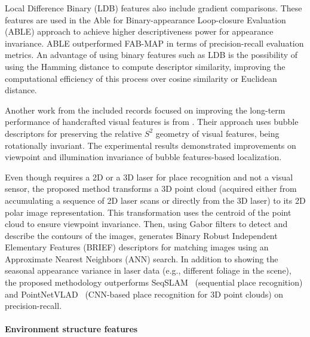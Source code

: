 Local Difference Binary (LDB) features also include gradient comparisons. These features are used in the Able for Binary-appearance Loop-closure Evaluation (ABLE) \parencite{arroyo-et-al:2018:7} approach to achieve higher descriptiveness power for appearance invariance.
ABLE outperformed FAB-MAP in terms of precision-recall evaluation metrics. An advantage of using binary features such as LDB is the possibility of using the Hamming distance to compute descriptor similarity, improving the computational efficiency of this process over cosine similarity or Euclidean distance.

Another work from the included records focused on improving the long-term performance of handcrafted visual features is from \cite{karaoguz-bozma:2016:4}. Their approach uses bubble descriptors for preserving the relative $S^2$ geometry of visual features, being rotationally invariant. The experimental results demonstrated improvements on viewpoint and illumination invariance of bubble features-based localization.

Even though \cite{cao-et-al:2021:2962416} requires a 2D or a 3D laser for place recognition and not a visual sensor, the proposed method transforms a 3D point cloud (acquired either from accumulating a sequence of 2D laser scans or directly from the 3D laser) to its 2D polar image representation. This transformation uses the centroid of the point cloud to ensure viewpoint invariance. Then, using Gabor filters to detect and describe the contours of the images, \cite{cao-et-al:2021:2962416} generates Binary Robust Independent Elementary Features (BRIEF) descriptors for matching images using an Approximate Nearest Neighbors (ANN) search. In addition to showing the seasonal appearance variance in laser data (e.g., different foliage in the scene), the proposed methodology outperforms SeqSLAM~\parencite{discussion:seqslam} (sequential place recognition) and PointNetVLAD~\parencite{discussion:pointnetvlad} (CNN-based place recognition for 3D point clouds) on precision-recall.


\paragraph{Environment structure features}

